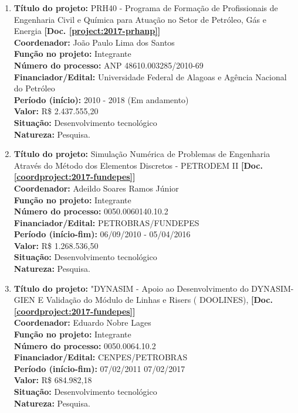 \documentclass[a4paper,oneside,10pt]{article}
\begin{document}
\begin{enumerate}
\renewcommand{\labelenumi}{{\large\bfseries\arabic{enumi}.}}

 \item \textbf{Título do projeto:} PRH40 - Programa de Formação de Profissionais de Engenharia Civil e Química para Atuação no Setor de Petróleo, Gás e Energia \textbf{[Doc. \ref{project:2017-prhanp}]}\\
      \textbf{Coordenador:} João Paulo Lima dos Santos\\
      \textbf{Função no projeto:} Integrante\\
      \textbf{Número do processo:} ANP 48610.003285/2010-69\\
      \textbf{Financiador/Edital:} Universidade Federal de Alagoas e Agência Nacional do Petróleo\\
      \textbf{Período (início):} 2010 - 2018 (Em andamento)\\
      \textbf{Valor:} R\$ 2.437.555,20 \\
      \textbf{Situação:} Desenvolvimento tecnológico\\
      \textbf{Natureza:} Pesquisa.    
  
  
 \newpage    
 \item \textbf{Título do projeto:}  Simulação Numérica de Problemas de Engenharia Através do Método dos Elementos Discretos - PETRODEM II \textbf{[Doc. \ref{coordproject:2017-fundepes}]}\\
      \textbf{Coordenador:} Adeildo Soares Ramos Júnior\\
      \textbf{Função no projeto:} Integrante\\
      \textbf{Número do processo:} 0050.0060140.10.2\\
      \textbf{Financiador/Edital:} PETROBRAS/FUNDEPES\\
      \textbf{Período (início-fim):} 06/09/2010 - 05/04/2016\\
        \textbf{Valor:} R\$ 1.268.536,50 \\
      \textbf{Situação:} Desenvolvimento tecnológico\\
      \textbf{Natureza:} Pesquisa.    

   
 \item \textbf{Título do projeto:}  "DYNASIM - Apoio ao Desenvolvimento do DYNASIM-GIEN E Validação do Módulo de Linhas e Risers ( DOOLINES), \textbf{[Doc. \ref{coordproject:2017-fundepes}]}\\
      \textbf{Coordenador:}  Eduardo Nobre Lages\\
      \textbf{Função no projeto:} Integrante\\
      \textbf{Número do processo:} 0050.0064.10.2\\
      \textbf{Financiador/Edital:} CENPES/PETROBRAS\\
      \textbf{Período (início-fim):} 07/02/2011 07/02/2017\\
        \textbf{Valor:} R\$ 684.982,18 \\
      \textbf{Situação:} Desenvolvimento tecnológico\\
      \textbf{Natureza:} Pesquisa.    
        

\end{enumerate}
\end{document}
